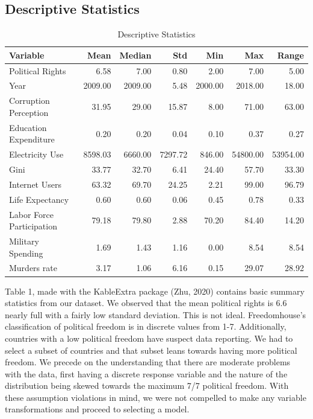 \documentclass[
  english,
  man,floatsintext]{apa6}
\begin{document}
\hypertarget{descriptive-statistics}{%
\subsection{Descriptive Statistics}\label{descriptive-statistics}}

\begin{longtable}[t]{lrrrrrr}
\caption{\label{tab:unnamed-chunk-2}Descriptive Statistics}\\
\toprule
Variable & Mean & Median & Std & Min & Max & Range\\
\midrule
Political Rights & 6.58 & 7.00 & 0.80 & 2.00 & 7.00 & 5.00\\
Year & 2009.00 & 2009.00 & 5.48 & 2000.00 & 2018.00 & 18.00\\
Corruption Perception & 31.95 & 29.00 & 15.87 & 8.00 & 71.00 & 63.00\\
Education Expenditure & 0.20 & 0.20 & 0.04 & 0.10 & 0.37 & 0.27\\
Electricity Use & 8598.03 & 6660.00 & 7297.72 & 846.00 & 54800.00 & 53954.00\\
\addlinespace
Gini & 33.77 & 32.70 & 6.41 & 24.40 & 57.70 & 33.30\\
Internet Users & 63.32 & 69.70 & 24.25 & 2.21 & 99.00 & 96.79\\
Life Expectancy & 0.60 & 0.60 & 0.06 & 0.45 & 0.78 & 0.33\\
Labor Force Participation & 79.18 & 79.80 & 2.88 & 70.20 & 84.40 & 14.20\\
Military Spending & 1.69 & 1.43 & 1.16 & 0.00 & 8.54 & 8.54\\
\addlinespace
Murders rate & 3.17 & 1.06 & 6.16 & 0.15 & 29.07 & 28.92\\
\bottomrule
\end{longtable}

Table 1, made with the KableExtra package (Zhu, 2020) contains basic summary statistics from our dataset. We observed that the mean political rights is 6.6 nearly full with a fairly low standard deviation. This is not ideal. Freedomhouse's classification of political freedom is in discrete values from 1-7. Additionally, countries with a low political freedom have suspect data reporting. We had to select a subset of countries and that subset leans towards having more political freedom. We precede on the understanding that there are moderate problems with the data, first having a discrete response variable and the nature of the distribution being skewed towards the maximum 7/7 political freedom.
With these assumption violations in mind, we were not compelled to make any variable transformations and proceed to selecting a model.
\end{document}

